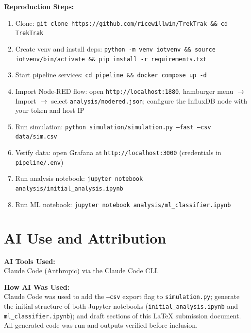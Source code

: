\documentclass[11pt]{article}
\begin{document}
\noindent\textbf{Reproduction Steps:}
\begin{enumerate}[noitemsep]
    \item Clone: \texttt{git clone https://github.com/ricewillwin/TrekTrak \&\& cd TrekTrak}
    \item Create venv and install deps: \texttt{python -m venv iotvenv \&\& source iotvenv/bin/activate \&\& pip install -r requirements.txt}
    \item Start pipeline services: \texttt{cd pipeline \&\& docker compose up -d}
    \item Import Node-RED flow: open \texttt{http://localhost:1880}, hamburger menu $\to$ Import $\to$ select \texttt{analysis/nodered.json}; configure the InfluxDB node with your token and host IP
    \item Run simulation: \texttt{python simulation/simulation.py --fast --csv data/sim.csv}
    \item Verify data: open Grafana at \texttt{http://localhost:3000} (credentials in \texttt{pipeline/.env})
    \item Run analysis notebook: \texttt{jupyter notebook analysis/initial\_analysis.ipynb}
    \item Run ML notebook: \texttt{jupyter notebook analysis/ml\_classifier.ipynb}
\end{enumerate}

\appendix
\section{AI Use and Attribution}
\label{sec:ai}

\noindent\textbf{AI Tools Used:}\\{}
Claude Code (Anthropic) via the Claude Code CLI.

\vspace{0.5em}

\noindent\textbf{How AI Was Used:}\\{}
Claude Code was used to add the \texttt{--csv} export flag to \texttt{simulation.py}; generate the initial structure of both Jupyter notebooks (\texttt{initial\_analysis.ipynb} and \texttt{ml\_classifier.ipynb}); and draft sections of this \LaTeX{} submission document. All generated code was run and outputs verified before inclusion.

\vspace{0.5em}
\end{document}
